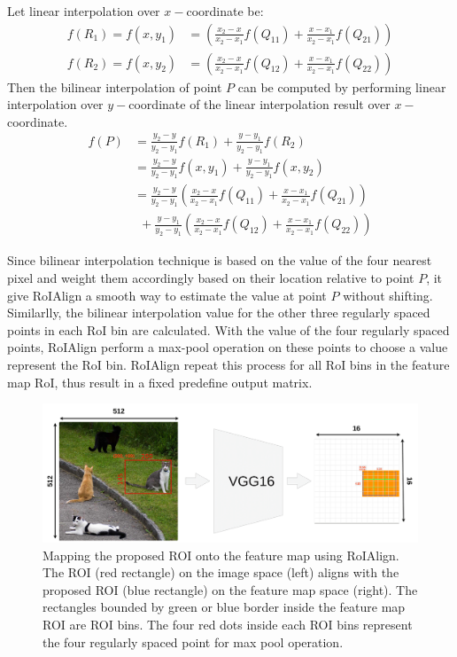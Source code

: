 \relax
{}\relax
\noindent Let linear interpolation over $x-$coordinate be:
\begin{align*}
    f(R_1) = f(x, y_1) &= \left( \frac{x_2-x}{x_2-x_1}f(Q_{11}) + \frac{x-x_1}{x_2-x_1}f(Q_{21}) \right) \\
    f(R_2) = f(x, y_2) &= \left( \frac{x_2-x}{x_2-x_1}f(Q_{12}) + \frac{x-x_1}{x_2-x_1}f(Q_{22}) \right)
\end{align*}
\noindent Then the bilinear interpolation of point $P$ can be computed by performing linear interpolation over $y-$coordinate of the linear interpolation result over $x-$coordinate. 
\begin{align}
    f(P) &= \frac{y_2-y}{y_2-y_1} f(R_1) + \frac{y-y_1}{y_2-y_1} f(R_2) \nonumber \\
    &= \frac{y_2-y}{y_2-y_1} f(x, y_1) + \frac{y-y_1}{y_2-y_1} f(x, y_2) \nonumber \\
    &= \frac{y_2-y}{y_2-y_1} \left( \frac{x_2-x}{x_2-x_1}f(Q_{11}) + \frac{x-x_1}{x_2-x_1}f(Q_{21}) \right) \nonumber \\
    &\ \ + \frac{y-y_1}{y_2-y_1} \left( \frac{x_2-x}{x_2-x_1}f(Q_{12}) + \frac{x-x_1}{x_2-x_1}f(Q_{22}) \right) \label{eq:binlinear_interpolation}
\end{align}
\relax
{}\relax

\noindent Since bilinear interpolation technique is based on the value of the four nearest pixel and weight them accordingly based on their location relative to point $P$, it give RoIAlign a smooth way to estimate the value at point $P$ without shifting. Similarlly, the bilinear interpolation value for the other three regularly spaced points in each RoI bin are calculated. With the value of the four regularly spaced points, RoIAlign perform a max-pool operation on these points to choose a value represent the RoI bin. RoIAlign repeat this process for all RoI bins in the feature map RoI, thus result in a fixed predefine output matrix.

\begin{figure}[!ht]
    \centering
    \includegraphics[width=6in]{figures/roi_align_ex.png}
    \caption{Mapping the proposed ROI onto the feature map using RoIAlign. The ROI (red rectangle) on the image space (left) aligns with the proposed ROI (blue rectangle) on the feature map space (right). The rectangles bounded by green or blue border inside the feature map ROI are ROI bins. The four red dots inside each ROI bins represent the four regularly spaced point for max pool operation. \cite{roi_pooling_problem}}
    \label{fig:roi_align_ex}
\end{figure}

